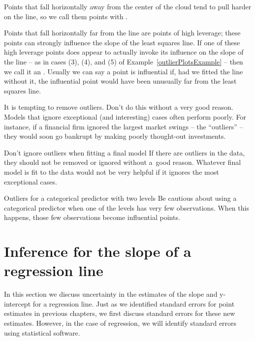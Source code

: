  \begin{termBox}{
Points that fall horizontally away from the center of the cloud tend to pull harder on the line, so we call them points with .}
\end{termBox}

Points that fall horizontally far from the line are points of high leverage; these points can strongly influence the slope of the least squares line. If one of these high leverage points does appear to actually invoke its influence on the slope of the line -- as in cases (3), (4), and (5) of Example~\ref{outlierPlotsExample} -- then we call it an . Usually we can say a point is influential if, had we fitted the line without it, the influential point would have been unusually far from the least squares line.

It is tempting to remove outliers. Don't do this without a very good reason. Models that ignore exceptional (and interesting) cases often perform poorly. For instance, if a financial firm ignored the largest market swings -- the ``outliers'' --  they would soon go bankrupt by making poorly thought-out investments.

\begin{caution}{Don't ignore outliers when fitting a final model}
{If there are outliers in the data, they should not be removed or ignored without a~good reason. Whatever final model is fit to the data would not be very helpful if it ignores the most exceptional cases.}
\end{caution}

\begin{caution}{Outliers for a categorical predictor with two levels}
{Be cautious about using a categorical predictor when one of the levels has very few observations. When this happens, those few observations become influential points.}
\end{caution}


\section{Inference for the slope of a regression line}
\label{inferenceForLinearRegression}

In this section we discuss uncertainty in the estimates of the slope and y-intercept for a regression line. Just as we identified standard errors for point estimates in previous chapters, we first discuss standard errors for these new estimates. However, in the case of regression, we will identify standard errors using statistical software.

